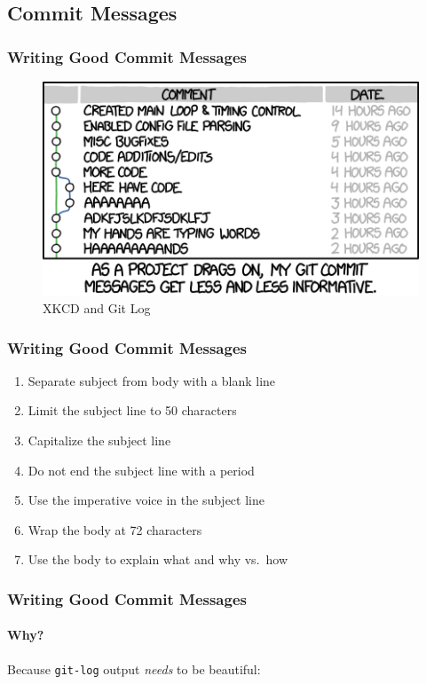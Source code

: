 \documentclass{beamer}
\begin{document}
\subsection{Commit Messages}
\begin{frame}
\frametitle{Writing Good Commit Messages}
\begin{figure}
\includegraphics[scale=0.45]{xkcd_git_commit.png}
\caption{XKCD and Git Log\cite{website:xkcd_revision_history_comic}}
\end{figure}
\end{frame}

\begin{frame}
\frametitle{Writing Good Commit Messages}
\begin{enumerate}
\item{Separate subject from body with a blank line}
\item{Limit the subject line to 50 characters}
\item{Capitalize the subject line}
\item{Do not end the subject line with a period}
\item{Use the imperative voice in the subject line}
\item{Wrap the body at 72 characters}
\item{Use the body to explain what and why vs.\ how}
\end{enumerate}
\end{frame}

\begin{frame}[fragile]
\frametitle{Writing Good Commit Messages}
\framesubtitle{Why?}
Because \texttt{git-log} output \textit{needs} to be beautiful:

\end{frame}
\end{document}

